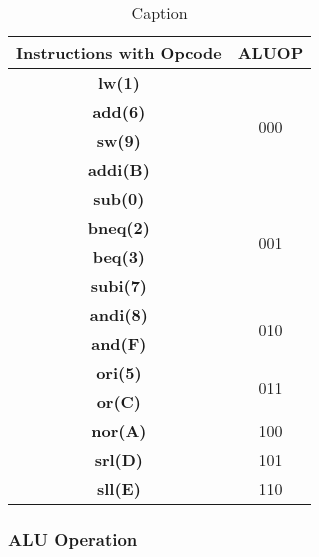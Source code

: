 \documentclass[12pt]{article}
\begin{document}
    \begin{table}[H]
        \centering
        \begin{tabular}{|c|c|}
            \hline 
            \textbf{Instructions with Opcode} & \textbf{ALUOP} \\
            \hline 
            \textbf{lw(1)}  & \multirow{4}{*}{000} \\
            \cline{1-1} 
            \textbf{add(6)} &  \\
            \cline{1-1} 
            \textbf{sw(9)}   &\\
            \cline{1-1}
            \textbf{addi(B)}  &\\
            
            \hline 
            \hline
            \textbf{sub(0)}   & \multirow{4}{*}{001} \\
            \cline{1-1} 
            \textbf{bneq(2)}  &  \\
            \cline{1-1} 
            \textbf{beq(3)}   &\\
            \cline{1-1}
            \textbf{subi(7)}  &\\
            
            \hline 
            \hline
            \textbf{andi(8)}   & \multirow{2}{*}{010} \\
            \cline{1-1} 
            \textbf{and(F)}  &  \\
             

            \hline 
            \hline
            \textbf{ori(5)}   & \multirow{2}{*}{011} \\
            \cline{1-1} 
            \textbf{or(C)}  &  \\
             
            \hline 
            \hline
            \textbf{nor(A)}   & 100 \\
            
            \hline 
            \hline
            \textbf{srl(D)}   & 101 \\

            \hline 
            \hline
            \textbf{sll(E)}   & 110 \\
            \hline 
              
        \end{tabular}
        \caption{Caption}
        \label{tab:my_label}
    \end{table}

\subsubsection{ALU Operation}
\end{document}
